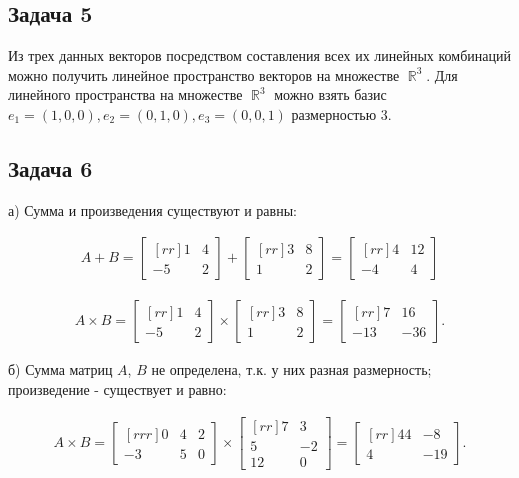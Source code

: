 \documentclass[a4paper,11pt]{article}
\DeclareMathOperator*{\R}{\mathbb{R}}   %
\begin{document}
\subsection{Задача 5}

Из трех данных векторов посредством составления всех их линейных комбинаций можно получить линейное пространство векторов на множестве $\R^3$. Для линейного пространства на множестве $\R^3$ можно взять базис $e_1 = (1, 0, 0), e_2 = (0, 1, 0), e_3 = (0, 0, 1)$ размерностью 3.

\subsection{Задача 6}

а) Сумма и произведения существуют и равны:

\begin{align*}
A + B = 
\begin{bmatrix}[rr]
 1 &  4 \\
-5 &  2 
\end{bmatrix}
+
\begin{bmatrix}[rr]
 3 &  8 \\
 1 &  2 
\end{bmatrix}
=
\begin{bmatrix}[rr]
 4 & 12 \\
-4 &  4
\end{bmatrix}
\end{align*}

\begin{align*}
A \times B = 
\begin{bmatrix}[rr]
 1 &  4 \\
-5 &  2 
\end{bmatrix}
\times
\begin{bmatrix}[rr]
 3 &  8 \\
 1 &  2 
\end{bmatrix}
=
\begin{bmatrix}[rr]
  7 &  16 \\
-13 & -36
\end{bmatrix}.
\end{align*}

б) Сумма матриц $A$, $B$ не определена, т.к. у них разная размерность; произведение - существует и равно:

\begin{align*}
A \times B = 
\begin{bmatrix}[rrr]
  0 & 4 & 2 \\
 -3 & 5 & 0 
\end{bmatrix}
\times
\begin{bmatrix}[rr]
  7 &  3 \\
  5 & -2 \\
 12 &  0
\end{bmatrix}
=
\begin{bmatrix}[rr]
 44 &  -8 \\
  4 & -19 
\end{bmatrix}.
\end{align*}
\end{document}
